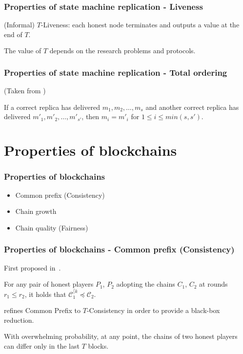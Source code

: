 \documentclass{beamer}
\begin{document}
\begin{frame}
\frametitle{Properties of state machine replication - Liveness}

(Informal) $T$-Liveness: each honest node terminates and outputs a value at the end of $T$.

The value of $T$ depends on the research problems and protocols.

\end{frame}


\begin{frame}
\frametitle{Properties of state machine replication - Total ordering}

(Taken from \cite{duan2018beat}) 

\begin{definition}
If a correct replica has delivered $m_1, m_2, \dots ,m_s$ and another correct replica has delivered $m'_1,m'_2, \dots,m'_{s'}$, then $m_i = m'_i$ for $1 \leq i \leq min(s, s')$.
\end{definition}

\end{frame}


\section{Properties of blockchains}

\begin{frame}
\frametitle{Properties of blockchains}

\begin{itemize}
    \item Common prefix (Consistency)
    \item Chain growth
    \item Chain quality (Fairness)
\end{itemize}

\end{frame}


\begin{frame}
\frametitle{Properties of blockchains - Common prefix (Consistency)}

First proposed in~\cite{garay2015bitcoin}.

\begin{definition}
For any pair of honest players $P_1$, $P_2$ adopting the chains $C_1$, $C_2$ at rounds $r_1 \leq r_2$, it holds that $\mathcal{C}_{1}^{\lceil k} \preceq \mathcal{C}_2$.
\end{definition}

\cite{pass2017analysis} refines Common Prefix to $T$-Consistency in order to provide a black-box reduction.

\begin{definition}[$T$-consistency]
With overwhelming probability, at any point, the chains of two honest players can differ only in the last $T$ blocks.
\end{definition}


\end{frame}
\end{document}
